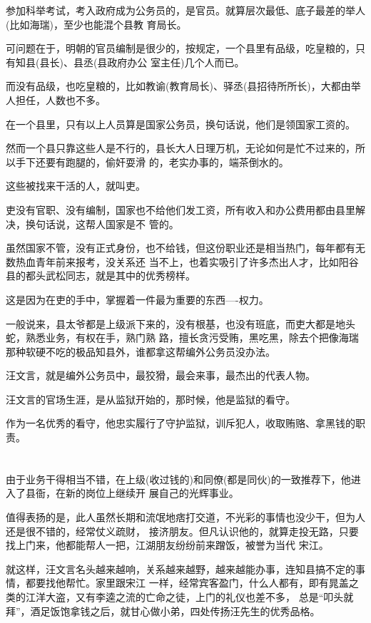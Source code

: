 \documentclass[11pt,a4paper,onecolumn]{article}
\begin{document}
参加科举考试，考入政府成为公务员的，是官员。就算层次最低、底子最差的举人(比如海瑞)，至少也能混个县教
育局长。

可问题在于，明朝的官员编制是很少的，按规定，一个县里有品级，吃皇粮的，只有知县(县长)、县丞(县政府办公
室主任)几个人而已。

而没有品级，也吃皇粮的，比如教谕(教育局长)、驿丞(县招待所所长)，大都由举人担任，人数也不多。

在一个县里，只有以上人员算是国家公务员，换句话说，他们是领国家工资的。

然而一个县只靠这些人是不行的，县长大人日理万机，无论如何是忙不过来的，所以手下还要有跑腿的，偷奸耍滑
的，老实办事的，端茶倒水的。

这些被找来干活的人，就叫吏。

吏没有官职、没有编制，国家也不给他们发工资，所有收入和办公费用都由县里解决，换句话说，这帮人国家是不
管的。

虽然国家不管，没有正式身份，也不给钱，但这份职业还是相当热门，每年都有无数热血青年前来报考，没关系还
当不上，也着实吸引了许多杰出人才，比如阳谷县的都头武松同志，就是其中的优秀榜样。

这是因为在吏的手中，掌握着一件最为重要的东西----权力。

一般说来，县太爷都是上级派下来的，没有根基，也没有班底，而吏大都是地头蛇，熟悉业务，有权在手，熟门熟
路，擅长贪污受贿，黑吃黑，除去个把像海瑞那种软硬不吃的极品知县外，谁都拿这帮编外公务员没办法。

汪文言，就是编外公务员中，最狡猾，最会来事，最杰出的代表人物。

汪文言的官场生涯，是从监狱开始的，那时候，他是监狱的看守。

作为一名优秀的看守，他忠实履行了守护监狱，训斥犯人，收取贿赂、拿黑钱的职责。

\section[\thesection]{}

由于业务干得相当不错，在上级(收过钱的)和同僚(都是同伙)的一致推荐下，他进入了县衙，在新的岗位上继续开
展自己的光辉事业。

值得表扬的是，此人虽然长期和流氓地痞打交道，不光彩的事情也没少干，但为人还是很不错的，经常仗义疏财，
接济朋友。但凡认识他的，就算走投无路，只要找上门来，他都能帮人一把，江湖朋友纷纷前来蹭饭，被誉为当代
宋江。

就这样，汪文言名头越来越响，关系越来越野，越来越能办事，连知县搞不定的事情，都要找他帮忙。家里跟宋江
一样，经常宾客盈门，什么人都有，即有晁盖之类的江洋大盗，又有李逵之流的亡命之徒，上门的礼仪也差不多，
总是``叩头就拜''，酒足饭饱拿钱之后，就甘心做小弟，四处传扬汪先生的优秀品格。
\end{document}
